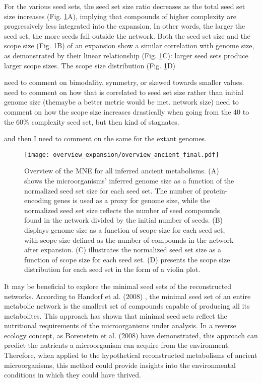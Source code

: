 For the various seed sets, the seed set size ratio decreases as the total seed set size increases (Fig. \ref{overview_ancient}A), implying that compounds of higher complexity are progressively less integrated into the expansion. In other words, the larger the seed set, the more seeds fall outside the network. Both the seed set size and the scope size (Fig. \ref{overview_ancient}B) of an expansion show a similar correlation with genome size, as demonstrated by their linear relationship (Fig. \ref{overview_ancient}C): larger seed sets produce larger scope sizes. The scope size distribution (Fig. \ref{overview_ancient}D) 

need to comment on bimodality, symmetry, or skewed towards smaller values. need to comment on how that is correlated to seed set size rather than initial genome size (themaybe a better metric would be met. network size)
need to comment on how the scope size increases drastically when going from the 40 to the 60\% complexity seed set, but then kind of stagnates. 

and then I need to comment on the same for the extant genomes.

\begin{figure}[H]
    \centering
    \texttt{[image: overview\_expansion/overview\_ancient\_final.pdf]}
    \caption{Overview of the MNE for all inferred ancient metabolisms. (A) shows the microorganisms' inferred genome size as a function of the normalized seed set size for each seed set. The number of protein-encoding genes is used as a proxy for genome size, while the normalized seed set size reflects the number of seed compounds found in the network divided by the initial number of seeds. (B) displays genome size as a function of scope size for each seed set, with scope size defined as the number of compounds in the network after expansion. (C) illustrates the normalized seed set size as a function of scope size for each seed set. (D) presents the scope size distribution for each seed set in the form of a violin plot.}
    \label{overview_ancient}
\end{figure} 

It may be beneficial to explore the minimal seed sets of the reconstructed networks. According to Handorf et al. (2008) \cite{handorf2008}, the minimal seed set of an entire metabolic network is the smallest set of compounds capable of producing all its metabolites. This approach has shown that minimal seed sets reflect the nutritional requirements of the microorganisms under analysis. In a reverse ecology concept, as Borenstein et al. (2008) \cite{borenstein2008} have demonstrated, this approach can predict the nutrients a microorganism can acquire from the environment. Therefore, when applied to the hypothetical reconstructed metabolisms of ancient microorganisms, this method could provide insights into the environmental conditions in which they could have thrived.


